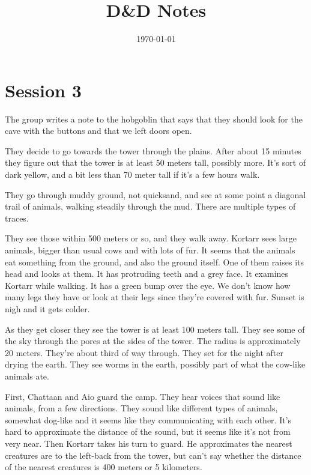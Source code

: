 \documentclass[10pt,a4paper,twoside,openany,hidelinks]{book}
\title{D\&D Notes}
\date{\today}
\begin{document}
\maketitle

\mainmatter

\chapter*{Session 3}

The group writes a note to the hobgoblin that says that they should look for the cave with the buttons and that we left doors open.


They decide to go towards the tower through the plains. After about 15 minutes they figure out that the tower is at least 50 meters tall, possibly more.
It's sort of dark yellow, and a bit less than 70 meter tall if it's a few hours walk.

They go through muddy ground, not quicksand, and see at some point a diagonal trail of animals, walking steadily through the mud. There are multiple types of traces.

They see those within 500 meters or so, and they walk away. Kortarr sees large animals, bigger than usual cows and with lots of fur. It seems that the animals eat something from the ground, and also the ground itself.
One of them raises its head and looks at them. It has protruding teeth and a grey face. It examines Kortarr while walking. It has a green bump over the eye. We don't know how many legs they have or look at their legs since they're covered with fur.
Sunset is nigh and it gets colder.

As they get closer they see the tower is at least 100 meters tall. They see some of the sky through the pores at the sides of the tower. The radius is approximately 20 meters. They're about third of way through. They set for the night after drying the earth. They see worms in the earth, possibly part of what the cow-like animals ate.

First, Chattaan and Aio guard the camp. They hear voices that sound like animals, from a few directions. They sound like different types of animals, somewhat dog-like and it seems like they communicating with each other. It's hard to approximate the distance of the sound, but it seems like it's not from very near.
Then Kortarr takes his turn to guard. He approximates the nearest creatures are to the left-back from the tower, but can't say whether the distance of the nearest creatures is 400 meters or 5 kilometers.
\end{document}
